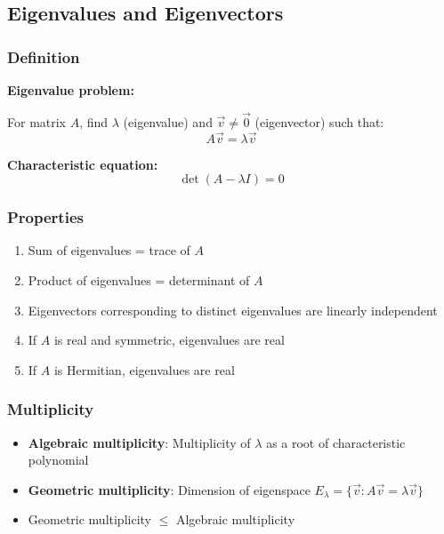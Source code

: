 \documentclass[12pt,a4paper]{article}
\begin{document}
\subsection{Eigenvalues and Eigenvectors}
\subsubsection{Definition}
\begin{importantbox}
\textbf{Eigenvalue problem:}

For matrix $A$, find $\lambda$ (eigenvalue) and $\vec{v} \neq \vec{0}$ (eigenvector) such that:
\begin{equation}
A\vec{v} = \lambda\vec{v}
\end{equation}

\textbf{Characteristic equation:}
\begin{equation}
\det(A - \lambda I) = 0
\end{equation}
\end{importantbox}

\subsubsection{Properties}
\begin{enumerate}
    \item Sum of eigenvalues = trace of $A$
    \item Product of eigenvalues = determinant of $A$
    \item Eigenvectors corresponding to distinct eigenvalues are linearly independent
    \item If $A$ is real and symmetric, eigenvalues are real
    \item If $A$ is Hermitian, eigenvalues are real
\end{enumerate}

\subsubsection{Multiplicity}
\begin{itemize}
    \item \textbf{Algebraic multiplicity}: Multiplicity of $\lambda$ as a root of characteristic polynomial
    \item \textbf{Geometric multiplicity}: Dimension of eigenspace $E_\lambda = \{\vec{v} : A\vec{v} = \lambda\vec{v}\}$
    \item Geometric multiplicity $\leq$ Algebraic multiplicity
\end{itemize}
\end{document}
